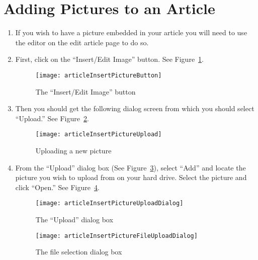 \documentclass{howto}
\begin{document}
\section{Adding Pictures to an Article}

\begin{enumerate}
\item{If you wish to have a picture embedded in your article you will need to use the editor on the edit article page to do so.}

\item{First, click on the “Insert/Edit Image” button. See Figure~\ref{insertPictureButton}.}

\begin{figure}[h]
  \begin{center}
    \texttt{[image: articleInsertPictureButton]}
  \end{center}
  \caption{The ``Insert/Edit Image'' button}
  \label{insertPictureButton}
\end{figure}

\item{Then you should get the following dialog screen from which you should select “Upload.”  See Figure~\ref{insertPictureUpload}.}

\begin{figure}[h]
  \begin{center}
    \texttt{[image: articleInsertPictureUpload]}
  \end{center}
  \caption{Uploading a new picture}
  \label{insertPictureUpload}
\end{figure}

\item{From the “Upload” dialog box (See Figure~\ref{insertPictureUploadDialog}), select “Add” and locate the picture you wish to upload from on your hard drive.  Select the picture and click “Open.”  See Figure~\ref{insertPictureFileUploadDialog}.}

\begin{figure}[h]
  \begin{center}
    \texttt{[image: articleInsertPictureUploadDialog]}
  \end{center}
  \caption{The ``Upload'' dialog box}
  \label{insertPictureUploadDialog}
\end{figure}

\begin{figure}[h]
  \begin{center}
    \texttt{[image: articleInsertPictureFileUploadDialog]}
  \end{center}
  \caption{The file selection dialog box}
  \label{insertPictureFileUploadDialog}
\end{figure}


\end{enumerate}
\end{document}
